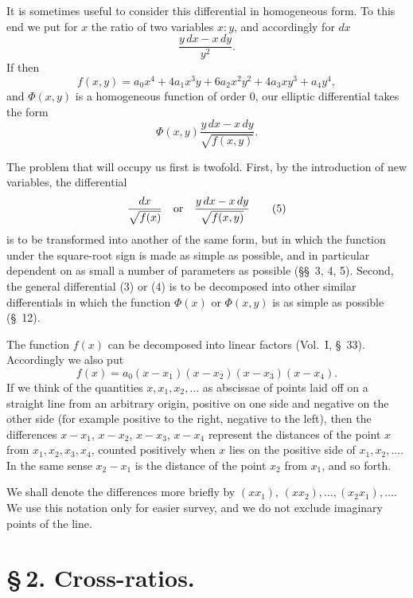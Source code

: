 \documentclass[11pt]{article}
\begin{document}
It is sometimes useful to consider this differential in homogeneous form. To this end we put for $x$ the ratio of two variables $x:y$, and accordingly for $dx$
\[
\frac{y\,dx-x\,dy}{y^2}.
\]
If then
\[
f(x,y)=a_0x^4+4a_1x^3y+6a_2x^2y^2+4a_3xy^3+a_4y^4,
\]
and $\Phi(x,y)$ is a homogeneous function of order $0$, our elliptic differential takes the form
\begin{equation}
\Phi(x,y)\frac{y\,dx-x\,dy}{\sqrt{f(x,y)}}.
\tag{4}
\end{equation}

The problem that will occupy us first is twofold. First, by the introduction of new variables, the differential
\begin{equation}
\frac{dx}{\sqrt{f(x)}}\quad\hbox{or}\quad \frac{y\,dx-x\,dy}{\sqrt{f(x,y)}}
\tag{5}
\end{equation}
is to be transformed into another of the same form, but in which the function under the square-root sign is made as simple as possible, and in particular dependent on as small a number of parameters as possible (\S\S~3, 4, 5). Second, the general differential (3) or (4) is to be decomposed into other similar differentials in which the function $\Phi(x)$ or $\Phi(x,y)$ is as simple as possible (\S~12).

The function $f(x)$ can be decomposed into linear factors (Vol.~I, \S~33). Accordingly we also put
\[
f(x)=a_0(x-x_1)(x-x_2)(x-x_3)(x-x_4).
\]
If we think of the quantities $x,x_1,x_2,\ldots$ as abscissae of points laid off on a straight line from an arbitrary origin, positive on one side and negative on the other side (for example positive to the right, negative to the left), then the differences $x-x_1$, $x-x_2$, $x-x_3$, $x-x_4$ represent the distances of the point $x$ from $x_1,x_2,x_3,x_4$, counted positively when $x$ lies on the positive side of $x_1,x_2,\ldots$. In the same sense $x_2-x_1$ is the distance of the point $x_2$ from $x_1$, and so forth.

We shall denote the differences more briefly by $(xx_1)$, $(xx_2),\ldots,(x_2x_1),\ldots$. We use this notation only for easier survey, and we do not exclude imaginary points of the line.

\section*{\S\,2. Cross-ratios.}
\end{document}

